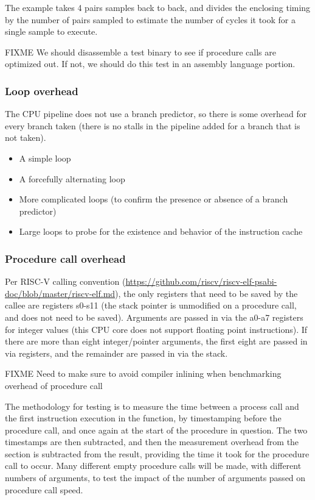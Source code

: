\documentclass{article}
\begin{document}
The example takes 4 pairs samples back to back, and divides the enclosing timing by the number of pairs sampled to estimate the number of cycles it took for a single sample to execute.

FIXME We should disassemble a test binary to see if procedure calls are optimized out. If not, we should do this test in an assembly language portion.

\subsubsection{Loop overhead}

The CPU pipeline does not use a branch predictor, so there is some overhead for every branch taken (there is no stalls in the pipeline added for a branch that is not taken).
\begin{itemize}
    \item A simple loop
    \item A forcefully alternating loop
    \item More complicated loops (to confirm the presence or absence of a branch predictor)
    \item Large loops to probe for the existence and behavior of the instruction cache
\end{itemize}
    
\subsubsection{Procedure call overhead}

Per RISC-V calling convention (\url{https://github.com/riscv/riscv-elf-psabi-doc/blob/master/riscv-elf.md}), the only registers that need to be saved by the callee are registers s0-s11 (the stack pointer is unmodified on a procedure call, and does not need to be saved). Arguments are passed in via the a0-a7 registers for integer values (this CPU core does not support floating point instructions). If there are more than eight integer/pointer arguments, the first eight are passed in via registers, and the remainder are passed in via the stack.

FIXME Need to make sure to avoid compiler inlining when benchmarking overhead of procedure call

The methodology for testing is to measure the time between a process call and the first instruction execution in the function, by timestamping before the procedure call, and once again at the start of the procedure in question. The two timestamps are then subtracted, and then the measurement overhead from the  section is subtracted from the result, providing the time it took for the procedure call to occur. Many different empty procedure calls will be made, with different numbers of arguments, to test the impact of the number of arguments passed on procedure call speed.
\end{document}
